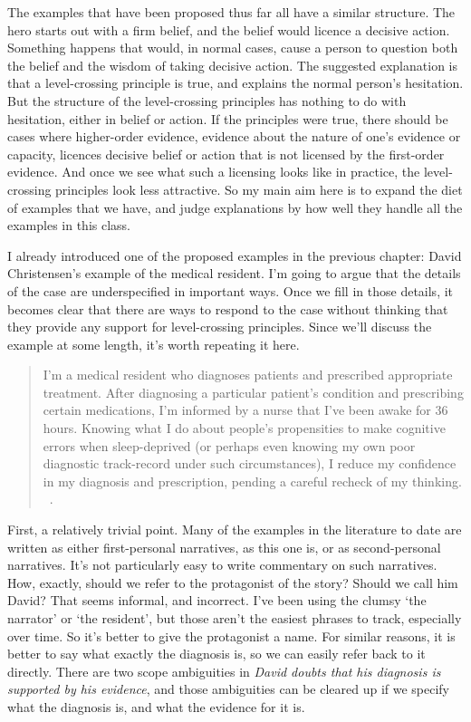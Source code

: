 The examples that have been proposed thus far all have a similar structure. The hero starts out with a firm belief, and the belief would licence a decisive action. Something happens that would, in normal cases, cause a person to question both the belief and the wisdom of taking decisive action. The suggested explanation is that a level-crossing principle is true, and explains the normal person's hesitation. But the structure of the level-crossing principles has nothing to do with hesitation, either in belief or action. If the principles were true, there should be cases where higher-order evidence, evidence about the nature of one's evidence or capacity, licences decisive belief or action that is not licensed by the first-order evidence. And once we see what such a licensing looks like in practice, the level-crossing principles look less attractive. So my main aim here is to expand the diet of examples that we have, and judge explanations by how well they handle all the examples in this class.

I already introduced one of the proposed examples in the previous chapter: David Christensen's example of the medical resident. I'm going to argue that the details of the case are underspecified in important ways. Once we fill in those details, it becomes clear that there are ways to respond to the case without thinking that they provide any support for level-crossing principles. Since we'll discuss the example at some length, it's worth repeating it here.

\begin{quote}
I'm a medical resident who diagnoses patients and prescribed appropriate treatment. After diagnosing a particular patient's condition and prescribing certain medications, I'm informed by a nurse that I've been awake for 36 hours. Knowing what I do about people's propensities to make cognitive errors when sleep-deprived (or perhaps even knowing my own poor diagnostic track-record under such circumstances), I reduce my confidence in my diagnosis and prescription, pending a careful recheck of my thinking. ~\citep[186]{Christensen2010a}.
\end{quote}
First, a relatively trivial point. Many of the examples in the literature to date are written as either first-personal narratives, as this one is, or as second-personal narratives. It's not particularly easy to write commentary on such narratives. How, exactly, should we refer to the protagonist of the story? Should we call him David? That seems informal, and incorrect. I've been using the clumsy `the narrator' or `the resident', but those aren't the easiest phrases to track, especially over time. So it's better to give the protagonist a name. For similar reasons, it is better to say what exactly the diagnosis is, so we can easily refer back to it directly. There are two scope ambiguities in \emph{David doubts that his diagnosis is supported by his evidence}, and those ambiguities can be cleared up if we specify what the diagnosis is, and what the evidence for it is.

